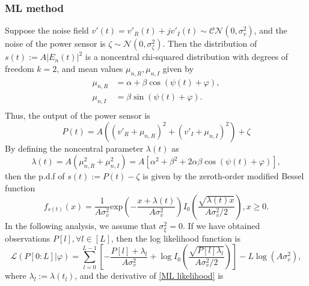 \documentclass[12pt,draftclsnofoot,journal,onecolumn]{IEEEtran}
\theoremstyle{nonumberplain}
\def \exp {\text{exp}}
\begin{document}
\subsubsection{ML method}
    Suppose the noise field $v'(t)=v'_R(t) + jv'_I(t)\sim \mathcal{CN}(0, \sigma_v^2)$, and the noise of the power sensor is $\zeta \sim \mathcal{N}(0, \sigma_{\zeta}^2)$. Then the distribution of $s(t) := A\left|E_n(t)\right|^2$ is a noncentral chi-squared distribution with degrees of freedom $k=2$, and mean values $\mu_{n,R}, \mu_{n,I}$ given by
    \begin{equation}
        \begin{aligned}
        \mu_{n,R} & = \alpha + \beta \cos(\psi(t)+\varphi),    \\ 
        \mu_{n,I} & = \beta \sin(\psi(t)+\varphi).   \\
        \end{aligned}
    \end{equation}
    Thus, the output of the power sensor is 
    \begin{equation}
        P(t)  = A\left((v'_{R} + \mu_{n,R})^2 + (v'_{I} + \mu_{n,I})^2 \right)+ \zeta 
        \label{eqn:sensor power}
    \end{equation}
    By defining the noncentral parameter $\lambda(t)$ as
    \begin{equation}
        \lambda(t)  = A(\mu_{n,R}^2 + \mu_{n,I}^2) = A\left[\alpha^{2}+\beta^{2}+2\alpha\beta\cos\left(\psi(t)+\varphi\right)\right],
    \end{equation}
    then the p.d.f of $s(t) := P(t)-\zeta$ is given by the zeroth-order modified Bessel function
    \begin{equation}
        f_{s(t)}(x) = \frac{1}{A\sigma_{v}^2} \exp\left(-\frac{x+\lambda(t)}{A\sigma_v^2}\right)I_{0}\left(\frac{\sqrt{\lambda(t) x}}{A\sigma_v^2/2}\right), x \geq 0.
        \label{ML single observation}
    \end{equation}
    In the following analysis, we assume that $\sigma_{\xi}^2 = 0$. If we have obtained observations $P[l], \forall l\in [L]$, then the log likelihood function is 
    \begin{equation}
        \mathcal{L}(P[0:L] | \varphi) = \sum_{l=0}^{L-1}\left[-\frac{P[l] + \lambda_l}{A\sigma_v^2} + \log I_0\left(\frac{\sqrt{P[l] \lambda_l}}{A\sigma_v^2/2}\right)\right] - L\log(A\sigma_v^2),
        \label{ML likelihood}
    \end{equation}
    where $\lambda_l := \lambda(t_l)$, and the derivative of \eqref{ML likelihood} is 
\end{document}
